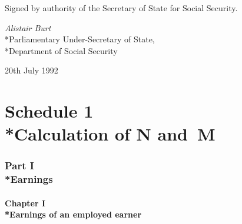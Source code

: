 \documentclass[12pt,a4paper]{article}
\begin{document}
\bigskip

Signed by authority of the Secretary of State for Social Security.

{\raggedleft
\emph{Alistair Burt}\\*Parliamentary Under-Secretary of State,\\*Department of Social Security

}

20th July 1992

\vfill

\small

\part[Schedule 1 --- Calculation of N and~M]{Schedule 1\\*Calculation of N and~M}

\section[Part I --- Earnings]{Part I\\*Earnings}

\subsection[Chapter I --- Earnings of an employed earner]{Chapter I\\*Earnings of an employed earner}

\renewcommand\parthead{--- Schedule 1 Part I Chapter I}
\end{document}
